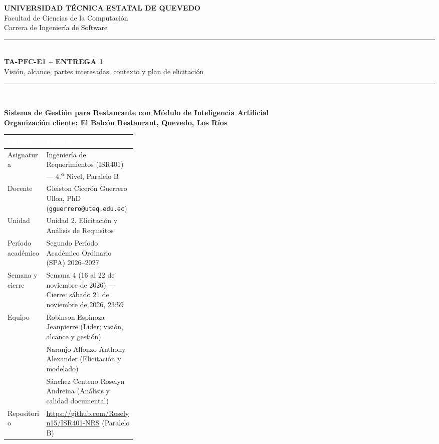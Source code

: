 \documentclass[11pt,a4paper]{article}
\newcommand{\thdr}[1]{\cellcolor{uteqgreen}\textcolor{white}{\textbf{#1}}}
\begin{document}
\begin{titlepage}
    \centering
    \vspace*{0.6cm}
    {\Large\textbf{\textcolor{uteqdark}{UNIVERSIDAD T\'ECNICA ESTATAL DE QUEVEDO}}}\\[0.25cm]
    {\large Facultad de Ciencias de la Computaci\'on}\\[0.15cm]
    {\large Carrera de Ingenier\'ia de Software}\\[0.8cm]

    \textcolor{uteqgreen}{\rule{\linewidth}{1.5pt}}\\[0.5cm]
    {\LARGE\textbf{TA-PFC-E1 -- ENTREGA 1}}\\[0.3cm]
    {\Large Visi\'on, alcance, partes interesadas, contexto y plan de elicitaci\'on}\\[0.45cm]
    \textcolor{uteqgreen}{\rule{\linewidth}{1.0pt}}\\[0.8cm]

    \begin{tcolorbox}[colback=boxbg,colframe=uteqgreen,boxrule=0.8pt,arc=2mm,title={\textbf{Proyecto Fin de Curso}}]
        \centering
        \textbf{Sistema de Gesti\'on para Restaurante con M\'odulo de Inteligencia Artificial}\\
        \textbf{Organizaci\'on cliente: El Balcón Restaurant, Quevedo, Los R\'ios}
    \end{tcolorbox}

    \vspace{0.7cm}

    \noindent\begin{tabularx}{\linewidth}{|p{0.30\linewidth}|Y|}
        \hline
        \thdr{Campo} & \thdr{Detalle}\\
        \hline
        Asignatura & Ingenier\'ia de Requerimientos (ISR401) --- 4.\textsuperscript{o} Nivel, Paralelo B\\
        \hline
         Docente & Gleiston Cicer\'on Guerrero Ulloa, PhD (\texttt{gguerrero@uteq.edu.ec})\\
        \hline
        Unidad & Unidad 2. Elicitaci\'on y An\'alisis de Requisitos\\
        \hline
         Per\'iodo acad\'emico & Segundo Per\'iodo Acad\'emico Ordinario (SPA) 2026--2027\\
        \hline
        Semana y cierre & Semana 4 (16 al 22 de noviembre de 2026) --- Cierre: s\'abado 21 de noviembre de 2026, 23:59\\
        \hline
         Equipo &
        Robinson Espinoza Jeanpierre (L\'ider; visi\'on, alcance y gesti\'on)\\
        & Naranjo Alfonzo Anthony Alexander (Elicitaci\'on y modelado)\\
        & S\'anchez Centeno Roselyn Andreina (An\'alisis y calidad documental)\\
        \hline
        Repositorio & \url{https://github.com/Roselyn15/ISR401-NRS} (Paralelo B)\\
        \hline
    \end{tabularx}


\end{titlepage}
\end{document}
